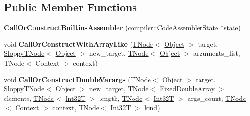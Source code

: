 \subsection*{Public Member Functions}
\begin{DoxyCompactItemize}
\item 
\mbox{\label{classv8_1_1internal_1_1CallOrConstructBuiltinsAssembler_accf854ecaad5637b3c0683385e85a1cc}} 
{\bfseries Call\+Or\+Construct\+Builtins\+Assembler} (\mbox{\hyperlink{classv8_1_1internal_1_1compiler_1_1CodeAssemblerState}{compiler\+::\+Code\+Assembler\+State}} $\ast$state)
\item 
\mbox{\label{classv8_1_1internal_1_1CallOrConstructBuiltinsAssembler_a7bc034e1d83ca9dae664ed4cd4d2554b}} 
void {\bfseries Call\+Or\+Construct\+With\+Array\+Like} (\mbox{\hyperlink{classv8_1_1internal_1_1compiler_1_1TNode}{T\+Node}}$<$ \mbox{\hyperlink{classv8_1_1internal_1_1Object}{Object}} $>$ target, \mbox{\hyperlink{classv8_1_1internal_1_1compiler_1_1SloppyTNode}{Sloppy\+T\+Node}}$<$ \mbox{\hyperlink{classv8_1_1internal_1_1Object}{Object}} $>$ new\+\_\+target, \mbox{\hyperlink{classv8_1_1internal_1_1compiler_1_1TNode}{T\+Node}}$<$ \mbox{\hyperlink{classv8_1_1internal_1_1Object}{Object}} $>$ arguments\+\_\+list, \mbox{\hyperlink{classv8_1_1internal_1_1compiler_1_1TNode}{T\+Node}}$<$ \mbox{\hyperlink{classv8_1_1internal_1_1Context}{Context}} $>$ context)
\item 
\mbox{\label{classv8_1_1internal_1_1CallOrConstructBuiltinsAssembler_a10d80b5c61d4d03d7c97c145e3524079}} 
void {\bfseries Call\+Or\+Construct\+Double\+Varargs} (\mbox{\hyperlink{classv8_1_1internal_1_1compiler_1_1TNode}{T\+Node}}$<$ \mbox{\hyperlink{classv8_1_1internal_1_1Object}{Object}} $>$ target, \mbox{\hyperlink{classv8_1_1internal_1_1compiler_1_1SloppyTNode}{Sloppy\+T\+Node}}$<$ \mbox{\hyperlink{classv8_1_1internal_1_1Object}{Object}} $>$ new\+\_\+target, \mbox{\hyperlink{classv8_1_1internal_1_1compiler_1_1TNode}{T\+Node}}$<$ \mbox{\hyperlink{classv8_1_1internal_1_1FixedDoubleArray}{Fixed\+Double\+Array}} $>$ elements, \mbox{\hyperlink{classv8_1_1internal_1_1compiler_1_1TNode}{T\+Node}}$<$ \mbox{\hyperlink{structv8_1_1internal_1_1Int32T}{Int32T}} $>$ length, \mbox{\hyperlink{classv8_1_1internal_1_1compiler_1_1TNode}{T\+Node}}$<$ \mbox{\hyperlink{structv8_1_1internal_1_1Int32T}{Int32T}} $>$ args\+\_\+count, \mbox{\hyperlink{classv8_1_1internal_1_1compiler_1_1TNode}{T\+Node}}$<$ \mbox{\hyperlink{classv8_1_1internal_1_1Context}{Context}} $>$ context, \mbox{\hyperlink{classv8_1_1internal_1_1compiler_1_1TNode}{T\+Node}}$<$ \mbox{\hyperlink{structv8_1_1internal_1_1Int32T}{Int32T}} $>$ kind)

\end{DoxyCompactItemize}
